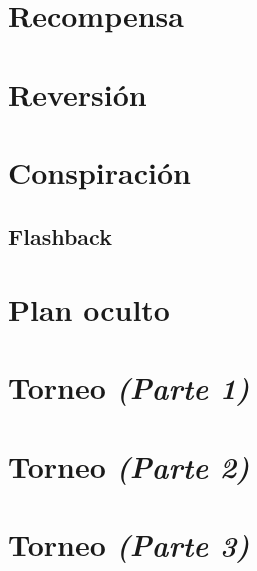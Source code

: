 \documentclass[11pt]{book}
\begin{document}
\chapter{Recompensa}


\chapter{Reversión}


\chapter{Conspiración}


\begin{appendices}
\renewcommand{\thechapter}{\arabic{chapter}}
\chapter{Flashback}

\end{appendices}

\chapter{Plan oculto}


\chapter{Torneo \emph{\mdseries(Parte 1)}}


\chapter{Torneo \emph{\mdseries(Parte 2)}}


\chapter{Torneo \emph{\mdseries(Parte 3)}}

\end{document}
